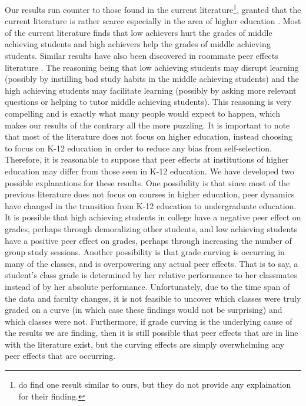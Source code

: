 Our results run counter to those found in the current literature\footnote{\citet{burke2013classroom} do find one result similar to ours, but they do not provide any explaination for their finding.}, granted that the current literature is rather scarce especially in the area of higher education \citep{kang2007classroom,carman2012classroom,burke2013classroom,schlosser2008inside,lavy2012good}. 
Most of the current literature finds that low achievers hurt the grades of middle achieving students and high achievers help the grades of middle achieving students. 
Similar results have also been discovered in roommate peer effects literature \citep{griffith2014peer,zimmerman2003peer,sacerdote2000peer}.
The reasoning being that low achieving students may disrupt learning (possibly by instilling bad study habits in the middle achieving students) and the high achieving students may facilitate learning (possibly by asking more relevant questions or helping to tutor middle achieving students). 
This reasoning is very compelling and is exactly what many people would expect to happen, which makes our results of the contrary all the more puzzling.  
It is important to note that most of the literature does not focus on higher education, instead choosing to focus on K-12 education in order to reduce any bias from self-selection. 
Therefore, it is reasonable to suppose that peer effects at institutions of higher education may differ from those seen in K-12 education. 
We have developed two possible explanations for these results. 
One possibility is that since most of the previous literature does not focus on courses in higher education, peer dynamics have changed in the transition from K-12 education to undergraduate education. 
It is possible that high achieving students in college have a negative peer effect on grades, perhaps through demoralizing other students, and low achieving students have a positive peer effect on grades, perhaps through increasing the number of group study sessions. 
Another possibility is that grade curving is occurring in many of the classes, and is overpowering any actual peer effects. 
That is to say, a student's class grade is determined by her relative performance to her classmates instead of by her absolute performance. 
Unfortunately, due to the time span of the data and faculty changes, it is not feasible to uncover which classes were truly graded on a curve (in which case these findings would not be surprising) and which classes were not. 
Furthermore, if grade curving is the underlying cause of the results we are finding, then it is still possible that peer effects that are in line with the literature exist, but the curving effects are simply overwhelming any peer effects that are occurring. 

